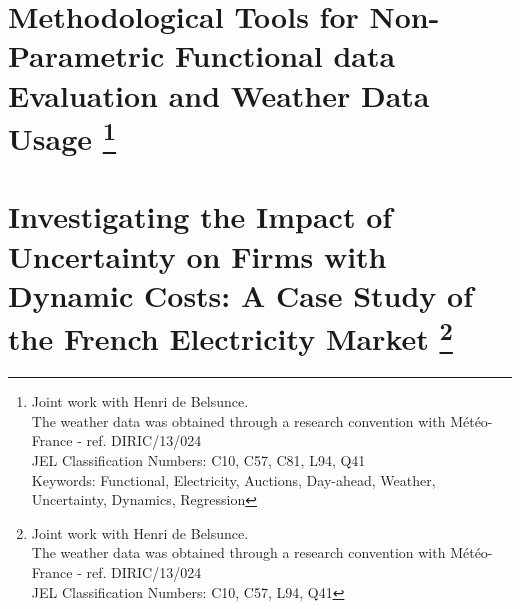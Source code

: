 \documentclass[book,12pt,twoside,openright,authoryear]{report}
\begin{document}
\renewcommand{\thesection}{\arabic{chapter}.\arabic{section}}
\chapter[Methodological Tools for Non-Parametric Functional data Evaluation and Weather Data Usage]{Methodological Tools for Non-Parametric Functional data Evaluation and Weather Data Usage \footnote{Joint work with Henri de Belsunce.\\
The weather data was obtained through a research convention with Météo-France - ref. DIRIC/13/024\\
JEL Classification Numbers: C10, C57, C81, L94, Q41\\
Keywords: Functional, Electricity, Auctions, Day-ahead, Weather, Uncertainty, Dynamics, Regression}}
\label{chap:ch1-5}
\pagestyle{empty} 
\cleardoublepage
\pagestyle{fancy} 
\fancyhead{} 

\fancyfoot{}
\fancyfoot[LE]{\thepage}





\renewcommand{\thesection}{\arabic{chapter}.\arabic{section}}
\chapter[Investigating the Impact of Uncertainty on Firms with Dynamic Costs: A Case Study of the French Electricity Market]{Investigating the Impact of Uncertainty on Firms with Dynamic Costs: A Case Study of the French Electricity Market \footnote{Joint work with Henri de Belsunce.\\
The weather data was obtained through a research convention with Météo-France - ref. DIRIC/13/024\\
JEL Classification Numbers: C10, C57, L94, Q41 }}
\label{chap:ch2}
\pagestyle{empty} 
\cleardoublepage
\pagestyle{fancy} 
\fancyhead{} 
\end{document}
